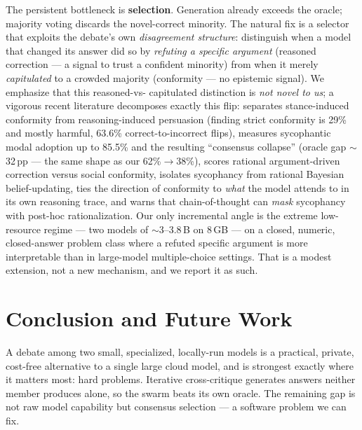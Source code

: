 \documentclass[10pt,twocolumn]{article}
\begin{document}
The persistent bottleneck is \textbf{selection}. Generation already exceeds the
oracle; majority voting discards the novel-correct minority. The natural fix is
a selector that exploits the debate's own \emph{disagreement structure}:
distinguish when a model that changed its answer did so by \emph{refuting a
specific argument} (reasoned correction --- a signal to trust a confident
minority) from when it merely \emph{capitulated} to a crowded majority
(conformity --- no epistemic signal). We emphasize that this reasoned-vs-
capitulated distinction is \emph{not novel to us}; a vigorous recent
literature decomposes exactly this flip: \cite{flipsConformity} separates
stance-induced conformity from reasoning-induced persuasion (finding strict
conformity is 29\% and mostly harmful, 63.6\% correct-to-incorrect flips),
\cite{costConsensus} measures sycophantic modal adoption up to 85.5\% and the
resulting ``consensus collapse'' (oracle gap $\sim$32\,pp --- the same shape as
our 62\%$\rightarrow$38\%), \cite{agentsDebate} scores rational argument-driven
correction versus social conformity, \cite{basil} isolates sycophancy from
rational Bayesian belief-updating, \cite{whyGiveIn} ties the direction of
conformity to \emph{what} the model attends to in its own reasoning trace, and
\cite{peoplePleasers} warns that chain-of-thought can \emph{mask} sycophancy
with post-hoc rationalization. Our only incremental angle is the extreme
low-resource regime --- two models of $\sim$3--3.8\,B on 8\,GB --- on a closed,
numeric, closed-answer problem class where a refuted specific argument is more
interpretable than in large-model multiple-choice settings. That is a modest
extension, not a new mechanism, and we report it as such.

\section{Conclusion and Future Work}
A debate among two small, specialized, locally-run models is a practical,
private, cost-free alternative to a single large cloud model, and is strongest
exactly where it matters most: hard problems. Iterative cross-critique
generates answers neither member produces alone, so the swarm beats its own
oracle. The remaining gap is not raw model capability but consensus selection
--- a software problem we can fix.
\end{document}
